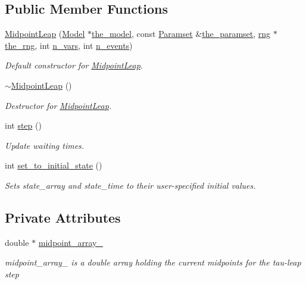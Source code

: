 \subsection*{Public Member Functions}
\begin{DoxyCompactItemize}
\item 
\hyperlink{class_midpoint_leap_a9e5301b74a349ecc4c1de994426eb8b2}{Midpoint\+Leap} (\hyperlink{class_model}{Model} $\ast$\hyperlink{class_realization_a47ec1d062b8caee874b08c1a17d6aeeb}{the\+\_\+model}, const \hyperlink{class_paramset}{Paramset} \&\hyperlink{class_realization_a119bb29de88929bc51bc1b329473a94b}{the\+\_\+paramset}, \hyperlink{classrng}{rng} $\ast$\hyperlink{class_realization_ac8d358d929afae90cf5790675b6744f9}{the\+\_\+rng}, int \hyperlink{class_realization_ad9951a0829e68e12fcb3817735bb5097}{n\+\_\+vars}, int \hyperlink{class_realization_afb711282bef806fc0020f91252d1df2c}{n\+\_\+events})
\begin{DoxyCompactList}\small\item\em Default constructor for \hyperlink{class_midpoint_leap}{Midpoint\+Leap}. \end{DoxyCompactList}\item 
\hyperlink{class_midpoint_leap_ae220cffbf343b380ef53e8a2749327f6}{$\sim$\+Midpoint\+Leap} ()
\begin{DoxyCompactList}\small\item\em Destructor for \hyperlink{class_midpoint_leap}{Midpoint\+Leap}. \end{DoxyCompactList}\item 
int \hyperlink{class_midpoint_leap_a8afc1a6a8777157f7b42ec08a848b564}{step} ()
\begin{DoxyCompactList}\small\item\em Update waiting times. \end{DoxyCompactList}\item 
int \hyperlink{class_midpoint_leap_a177682cf5042407ccee1a443e8920896}{set\+\_\+to\+\_\+initial\+\_\+state} ()
\begin{DoxyCompactList}\small\item\em Sets state\+\_\+array and state\+\_\+time to their user-\/specified initial values. \end{DoxyCompactList}\end{DoxyCompactItemize}
\subsection*{Private Attributes}
\begin{DoxyCompactItemize}
\item 
\mbox{\label{class_midpoint_leap_abf06466b009f0e52938cbf8fd299f406}} 
double $\ast$ \hyperlink{class_midpoint_leap_abf06466b009f0e52938cbf8fd299f406}{midpoint\+\_\+array\+\_\+}
\begin{DoxyCompactList}\small\item\em midpoint\+\_\+array\+\_\+ is a double array holding the current midpoints for the tau-\/leap step \end{DoxyCompactList}\end{DoxyCompactItemize}
